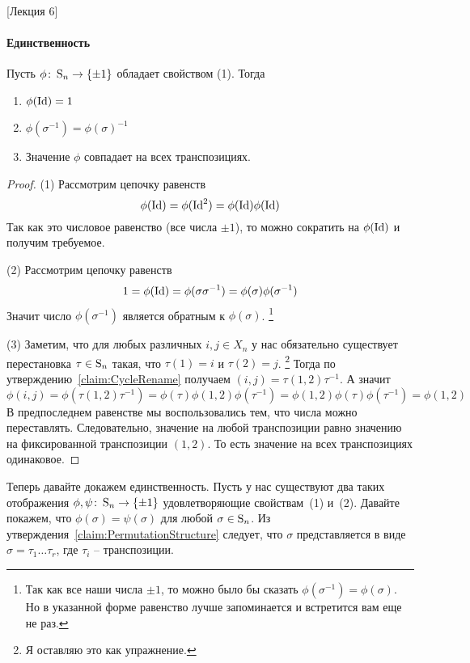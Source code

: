 [Лекция 6]


\paragraph{Единственность}

\begin{claim*}
Пусть $\phi\colon \operatorname{S}_{n}\to \{\pm1\}$ обладает свойством (1).
Тогда
\begin{enumerate}
\item $\phi(\operatorname{Id}) = 1$

\item $\phi(\sigma^{-1}) = \phi(\sigma)^{-1}$

\item Значение $\phi$ совпадает на всех транспозициях.
\end{enumerate}
\end{claim*}
\begin{proof}
(1) Рассмотрим цепочку равенств
\[
\phi(\operatorname{Id}) = \phi(\operatorname{Id}^2) = \phi(\operatorname{Id})\phi(\operatorname{Id})
\]
Так как это числовое равенство (все числа $\pm 1$), то можно сократить на $\phi(\operatorname{Id})$ и получим требуемое.


(2) Рассмотрим цепочку равенств
\[
1 = \phi(\operatorname{Id}) = \phi(\sigma \sigma^{-1}) = \phi(\sigma)\phi(\sigma^{-1})
\]
Значит число $\phi(\sigma^{-1})$ является обратным к $\phi(\sigma)$.%
\footnote{Так как все наши числа $\pm 1$, то можно было бы сказать $\phi(\sigma^{-1}) = \phi(\sigma)$.
Но в указанной форме равенство лучше запоминается и встретится вам еще не раз.}

(3) Заметим, что для любых различных $i, j\in X_n$ у нас обязательно существует перестановка $\tau\in\operatorname{S}_{n}$ такая, что $\tau(1) = i$ и $\tau(2) = j$.%
\footnote{Я оставляю это как упражнение.}
Тогда по утверждению~\ref{claim:CycleRename} получаем $(i,j) = \tau (1,2)\tau^{-1}$.
А значит
\[
\phi(i,j) = \phi(\tau (1,2) \tau^{-1}) = \phi(\tau)\phi(1,2)\phi(\tau^{-1}) = \phi(1,2)\phi(\tau)\phi(\tau^{-1}) = \phi(1,2)
\]
В предпоследнем равенстве мы воспользовались тем, что числа можно переставлять.
Следовательно, значение на любой транспозиции равно значению на фиксированной транспозиции $(1,2)$.
То есть значение на всех транспозициях одинаковое.
\end{proof}

Теперь давайте докажем единственность.
Пусть у нас существуют два таких отображения $\phi, \psi\colon \operatorname{S}_{n}\to \{\pm 1\}$ удовлетворяющие свойствам~(1) и~(2).
Давайте покажем, что $\phi(\sigma) = \psi(\sigma)$ для любой $\sigma\in\operatorname{S}_{n}$.
Из утверждения~\ref{claim:PermutationStructure}  следует, что $\sigma$ представляется в виде $\sigma = \tau_1\ldots\tau_r$, где $\tau_i$ -- транспозиции.

